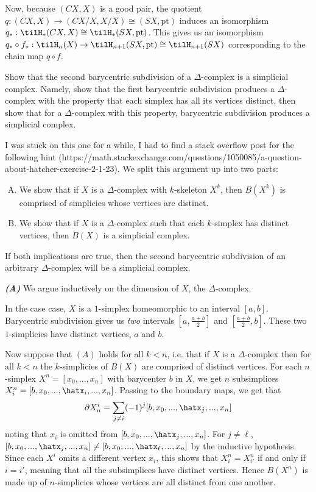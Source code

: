\begin{homework}[e]
\begin{prf}
    Now, because $(CX,X)$ is a good pair, the quotient $q:(CX,X) \to (CX/X,X/X) \cong (SX,\text{pt})$ induces an isomorphism $q_*:\tilH_*(CX,X) \cong\tilH_*(SX,\text{pt})$. This gives us an isomorphism $q_*\circ f_*:\tilH_n(X) \to \tilH_{n+1}(SX,\text{pt}) \cong \tilH_{n+1}(SX)$ corresponding to the chain map $q\circ f$.
  \end{prf}
   Show that the second barycentric subdivision of a $\Delta$-complex is a simplicial complex. Namely, show that the first barycentric subdivision produces a $\Delta$-complex with the property that each simplex has all its vertices distinct, then show that for a $\Delta$-complex with this property, barycentric subdivision produces a simplicial complex.
  \begin{prf}
    I was stuck on this one for a while, I had to find a stack overflow post for the following hint (https://math.stackexchange.com/questions/1050085/a-question-about-hatcher-exercise-2-1-23). We split this argument up into two parts: 
    \begin{enumerate}[(A)]
      \item We show that if $X$ is a $\Delta$-complex with $k$-skeleton $X^k$, then $B(X^k)$ is comprised of simplicies whose vertices are distinct.
      \item We show that if $X$ is a $\Delta$-complex such that each $k$-simplex has distinct vertices, then $B(X)$ is a simplicial complex.
    \end{enumerate}
    If both implications are true, then the second barycentric subdivision of an arbitrary $\Delta$-complex will be a simplicial complex.

    \bigskip

    \noindent \textbf{\emph{(A)}}\hspace{1em} We argue inductively on the dimension of $X$, the $\Delta$-complex.

    In the case case, $X$ is a $1$-simplex homeomorphic to an interval $[a,b]$. Barycentric subdivision gives us \emph{two} intervals $\left[a,\frac{a+b}{2}\right]$ and $\left[\frac{a+b}{2},b\right]$. These two $1$-simplicies have distinct vertices, $a$ and $b$.

    Now suppose that $(A)$ holds for all $k < n$, i.e. that if $X$ is a $\Delta$-complex then for all $k < n$ the $k$-simplicies of $B(X)$ are comprised of distinct vertices. For each $n$-simplex $X^n = [x_0,...,x_n]$ with barycenter $b$ in $X$, we get $n$ subsimplices $X_i^n = [b,x_0,...,\hatx_i,...,x_n]$. Passing to the boundary maps, we get that
    \begin{align*}
      \partial X^i_n = \sum_{j \neq i} (-1)^j[b,x_0,...,\hatx_j,...,x_n]
    \end{align*}
    noting that $x_i$ is omitted from $[b,x_0,...,\hatx_j,...,x_n]$. For $j\neq \ell$, $[b,x_0,...,\hatx_j,...,x_n]\neq [b,x_0,...,\hatx_\ell,...,x_n]$ by the inductive hypothesis. Since each $X^i$ omits a different vertex $x_i$, this shows that $X^n_i = X^n_{i'}$ if and only if $i = i'$, meaning that all the subsimplices have distinct vertices. Hence $B(X^n)$ is made up of $n$-simplicies whose vertices are all distinct from one another.


\end{prf}
\end{homework}
